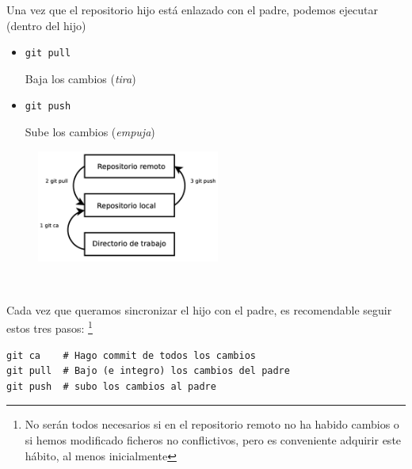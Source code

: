 \documentclass[ucs]{beamer}
\begin{document}
\begin{frame}[fragile]
\frametitle{}
Una vez que el repositorio hijo está enlazado con el padre, podemos ejecutar (dentro del hijo)
\begin{itemize}
\item
\verb|git pull| 

Baja los cambios (\emph{tira})

\item
\verb|git push|

Sube los cambios (\emph{empuja})
\end{itemize}



\end{frame}
\begin{frame}[fragile]
\begin{minipage}{7cm}
\begin{figure}
\begin{center}
\includegraphics[width=6cm]{figs/ca_pull_push}
\end{center}
\end{figure}

\end{minipage} \hfill
\

Cada vez que queramos sincronizar el hijo con el padre,
es recomendable seguir estos tres pasos:
\footnote{No serán todos necesarios si en el repositorio remoto
no ha habido cambios o si hemos modificado ficheros no conflictivos, pero es
conveniente adquirir este hábito, al menos inicialmente}

  \begin{scriptsize}
  \begin{verbatim}
git ca    # Hago commit de todos los cambios
git pull  # Bajo (e integro) los cambios del padre
git push  # subo los cambios al padre
  \end{verbatim}
  \end{scriptsize}
\end{frame}
\end{document}
